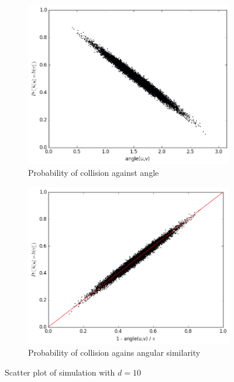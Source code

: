 \documentclass{ethz_report}
\begin{document}
\begin{figure}[h]
\centering
\begin{subfigure}[b]{.5\textwidth}
    \includegraphics[width=1\linewidth]{../code/simulation_vs_angle_10.png}
    \caption{Probability of collision against angle}
    \label{fig:angle_10}
\end{subfigure}%
\begin{subfigure}[b]{.5\textwidth}
    \includegraphics[width=1\linewidth]{../code/simulation_vs_similarity_10.png}
    \caption{Probability of collision agains angular similarity}
    \label{fig:similarity_10}
\end{subfigure}
\caption{Scatter plot of simulation with $d=10$}
\label{fig:d_10}
\end{figure}
\end{document}
